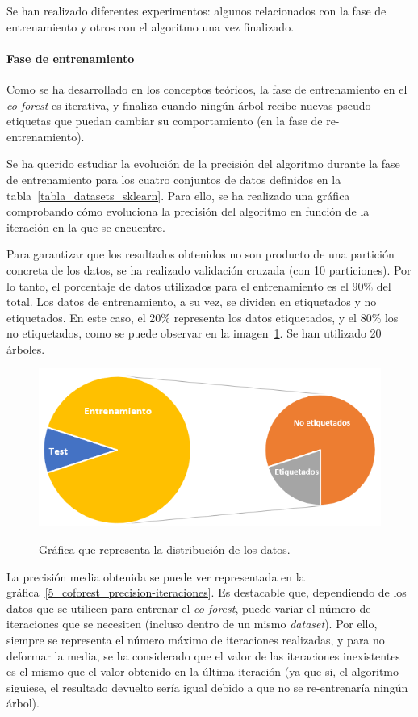 Se han realizado diferentes experimentos: algunos relacionados con la fase de entrenamiento y otros con el algoritmo una vez finalizado.

\paragraph{Fase de entrenamiento}

Como se ha desarrollado en los conceptos teóricos, la fase de entrenamiento en el \textit{co-forest} es iterativa, y finaliza cuando ningún árbol recibe nuevas pseudo-etiquetas que puedan cambiar su comportamiento (en la fase de re-entrenamiento).

Se ha querido estudiar la evolución de la precisión del algoritmo durante la fase de entrenamiento para los cuatro conjuntos de datos definidos en la tabla~\ref{tabla_datasets_sklearn}. Para ello, se ha realizado una gráfica comprobando cómo evoluciona la precisión del algoritmo en función de la iteración en la que se encuentre.

Para garantizar que los resultados obtenidos no son producto de una partición concreta de los datos, se ha realizado validación cruzada (con 10 particiones). Por lo tanto, el porcentaje de datos utilizados para el entrenamiento es el $90\%$ del total. Los datos de entrenamiento, a su vez, se dividen en etiquetados y no etiquetados. En este caso, el 20\% representa los datos etiquetados, y el 80\% los no etiquetados, como se puede observar en la imagen~\ref{5_entrenamiento_particiones}. Se han utilizado 20 árboles.

\begin{figure}[h]
	\caption{Gráfica que representa la distribución de los datos.}
	\centering
	\includegraphics[width=\textwidth]{../img/memoria/5_entrenamiento_particiones}
	\label{5_entrenamiento_particiones}
\end{figure}


 La precisión media obtenida se puede ver representada en la gráfica~\ref{5_coforest_precision-iteraciones}. Es destacable que, dependiendo de los datos que se utilicen para entrenar el \textit{co-forest}, puede variar el número de iteraciones que se necesiten (incluso dentro de un mismo \textit{dataset}). Por ello, siempre se representa el número máximo de iteraciones realizadas, y para no deformar la media, se ha considerado que el valor de las iteraciones inexistentes es el mismo que el valor obtenido en la última iteración (ya que si, el algoritmo siguiese, el resultado devuelto sería igual debido a que no se re-entrenaría ningún árbol).

